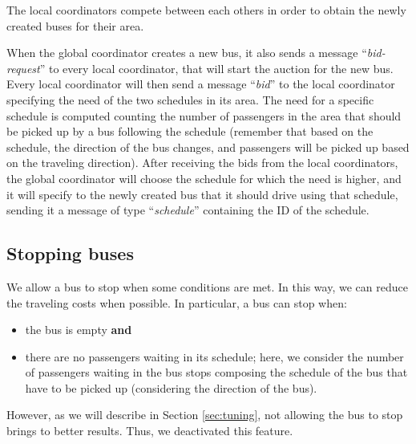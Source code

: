 The local coordinators compete between each others in order to obtain the newly created buses for their area.

When the global coordinator creates a new bus, it also sends a message ``\textit{bid-request}'' to every local coordinator, that will start the auction for the new bus. Every local coordinator will then send a message ``\textit{bid}'' to the local coordinator specifying the need of the two schedules in its area. The need for a specific schedule is computed counting the number of passengers in the area that should be picked up by a bus following the schedule (remember that based on the schedule, the direction of the bus changes, and passengers will be picked up based on the traveling direction). After receiving the bids from the local coordinators, the global coordinator will choose the schedule for which the need is higher, and it will specify to the newly created bus that it should drive using that schedule, sending it a message of type ``\textit{schedule}'' containing the ID of the schedule.

\subsection{Stopping buses}
\label{sec:stop}

We allow a bus to stop when some conditions are met. In this way, we can reduce the traveling costs when possible. In particular, a bus can stop when:

\begin{itemize}
\item the bus is empty \textbf{and}
\item there are no passengers waiting in its schedule; here, we consider the number of passengers waiting in the bus stops composing the schedule of the bus that have to be picked up (considering the direction of the bus).
\end{itemize}

However, as we will describe in Section \ref{sec:tuning}, not allowing the bus to stop brings to better results. Thus, we deactivated this feature.
